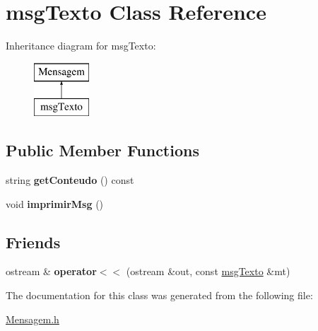 \hypertarget{classmsg_texto}{}\section{msg\+Texto Class Reference}
\label{classmsg_texto}
Inheritance diagram for msg\+Texto\+:\begin{figure}[H]
\begin{center}
\leavevmode
\includegraphics[height=2.000000cm]{classmsg_texto}
\end{center}
\end{figure}
\subsection*{Public Member Functions}
\begin{DoxyCompactItemize}
\item 
\hypertarget{classmsg_texto_ab79a4329094490f284235855888f2656}{}string {\bfseries get\+Conteudo} () const \label{classmsg_texto_ab79a4329094490f284235855888f2656}

\item 
\hypertarget{classmsg_texto_ae3c3b04bb04afb3e114effec8a7071d4}{}void {\bfseries imprimir\+Msg} ()\label{classmsg_texto_ae3c3b04bb04afb3e114effec8a7071d4}

\end{DoxyCompactItemize}
\subsection*{Friends}
\begin{DoxyCompactItemize}
\item 
\hypertarget{classmsg_texto_ad84dea0e91e0526508d5cdf38d12292f}{}ostream \& {\bfseries operator$<$$<$} (ostream \&out, const \hyperlink{classmsg_texto}{msg\+Texto} \&mt)\label{classmsg_texto_ad84dea0e91e0526508d5cdf38d12292f}

\end{DoxyCompactItemize}


The documentation for this class was generated from the following file\+:\begin{DoxyCompactItemize}
\item 
\hyperlink{_mensagem_8h}{Mensagem.\+h}\end{DoxyCompactItemize}
